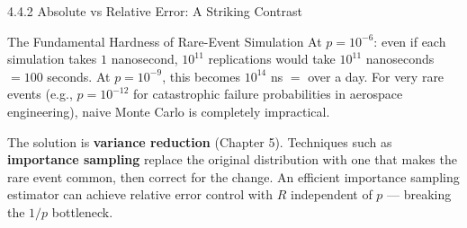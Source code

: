 \documentclass[aspectratio=169,10pt]{beamer}
\begin{document}
\begin{frame}[allowframebreaks]{4.4.2 Absolute vs Relative Error: A Striking Contrast}
\begin{alertblock}{The Fundamental Hardness of Rare-Event Simulation}
  At $p = 10^{-6}$: even if each simulation takes $1$ nanosecond, $10^{11}$
  replications would take $10^{11}$ nanoseconds $= 100$ seconds.  At $p = 10^{-9}$,
  this becomes $10^{14}$ ns $= $ over a day.  For very rare events (e.g.,
  $p = 10^{-12}$ for catastrophic failure probabilities in aerospace engineering),
  naive Monte Carlo is completely impractical.

  The solution is \textbf{variance reduction} (Chapter 5).  Techniques such as
  \textbf{importance sampling} replace the original distribution with one that
  makes the rare event common, then correct for the change.  An efficient
  importance sampling estimator can achieve relative error control with $R$
  independent of $p$ --- breaking the $1/p$ bottleneck.
\end{alertblock}

\end{frame}
\end{document}
